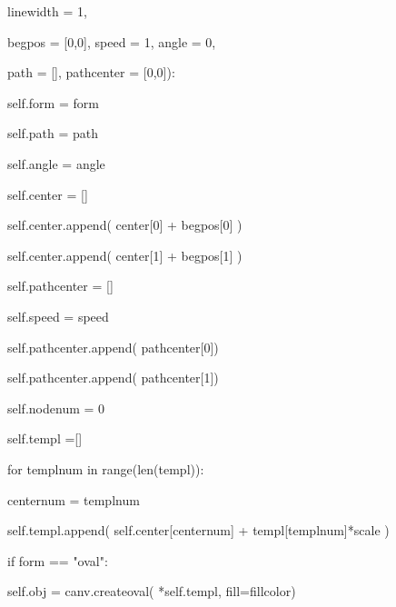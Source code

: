 \documentclass[14pt, oneside]{SavkinSeliverstov}
\begin{document}
		     line\underline{\hspace{0.2cm}}width = 1,
		     
		     beg\underline{\hspace{0.2cm}}pos = [0,0], speed = 1, angle = 0,
		     
		     path = [], path\underline{\hspace{0.2cm}}center = [0,0]):
		     
				 
		
		self.form = form
		
		self.path = path
		
		self.angle = angle
		
		self.center = []
		
		self.center.append( center[0] + beg\underline{\hspace{0.2cm}}pos[0] )
		
		self.center.append( center[1] + beg\underline{\hspace{0.2cm}}pos[1] )
		
		self.path\underline{\hspace{0.2cm}}center = []
		
		self.speed = speed
		
		self.path\underline{\hspace{0.2cm}}center.append( path\underline{\hspace{0.2cm}}center[0])
		
		self.path\underline{\hspace{0.2cm}}center.append( path\underline{\hspace{0.2cm}}center[1])
		
		self.node\underline{\hspace{0.2cm}}num = 0
		
		
		self.templ =[]
		
		for templ\underline{\hspace{0.2cm}}num in range(len(templ)):
		
			center\underline{\hspace{0.2cm}}num = templ\underline{\hspace{0.2cm}}num %
			
			self.templ.append( self.center[center\underline{\hspace{0.2cm}}num] + templ[templ\underline{\hspace{0.2cm}}num]*scale ) 
			
			       
		
		if form == "oval":
		
			self.obj = canv.create\underline{\hspace{0.2cm}}oval( *self.templ,
			fill=fill\underline{\hspace{0.2cm}}color)
			
\end{document}
